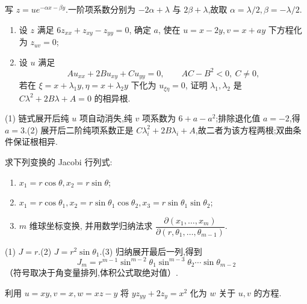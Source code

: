 \begin{solution}
    写 $z=u e^{-\alpha x-\beta y}$.一阶项系数分别为 $-2\alpha+\lambda$ 与 $2\beta+\lambda$,故取 $\alpha=\lambda/2,\beta=-\lambda/2$.
\end{solution}

\begin{example}[\markstar]
    \begin{enumerate}
        \item 设 $z$ 满足 $6z_{xx}+z_{xy}-z_{yy}=0$, 确定 $a$, 使在 $u=x-2y,v=x+ay$ 下方程化为 $z_{uv}=0$;
        \item 设 $u$ 满足
              \[
                  Au_{xx}+2Bu_{xy}+Cu_{yy}=0,
                  \qquad AC-B^2<0,\ C\ne0,
              \]
              若在 $\xi=x+\lambda_1y,\eta=x+\lambda_2y$ 下化为 $u_{\xi\eta}=0$, 证明 $\lambda_1,\lambda_2$ 是 $C\lambda^2+2B\lambda+A=0$ 的相异根.
    \end{enumerate}
\end{example}
\exampleblank

\begin{solution}
    (1) 链式展开后纯 $u$ 项自动消失,纯 $v$ 项系数为 $6+a-a^2$;排除退化值 $a=-2$,得 $a=3$.(2) 展开后二阶纯项系数正是 $C\lambda_i^2+2B\lambda_i+A$,故二者为该方程两根;双曲条件保证根相异.
\end{solution}

\begin{example}[\markstar]
    求下列变换的 Jacobi 行列式:
    \begin{enumerate}
        \item $x_1=r\cos\theta,x_2=r\sin\theta$;
        \item $x_1=r\cos\theta_1,x_2=r\sin\theta_1\cos\theta_2,x_3=r\sin\theta_1\sin\theta_2$;
        \item $m$ 维球坐标变换, 并用数学归纳法求 $\dfrac{\partial(x_1,\ldots,x_m)}{\partial(r,\theta_1,\ldots,\theta_{m-1})}$.
    \end{enumerate}
\end{example}
\exampleblank

\begin{solution}
    (1) $J=r$.(2) $J=r^2\sin\theta_1$.(3) 归纳展开最后一列,得到
    \[
        J_m=r^{m-1}\sin^{m-2}\theta_1\sin^{m-3}\theta_2\cdots\sin\theta_{m-2}
    \]
    （符号取决于角变量排列,体积公式取绝对值）.
\end{solution}

\begin{example}
    利用 $u=xy,v=x,w=xz-y$ 将 $yz_{yy}+2z_y=x^2$ 化为 $w$ 关于 $u,v$ 的方程.
\end{example}
\exampleblank

